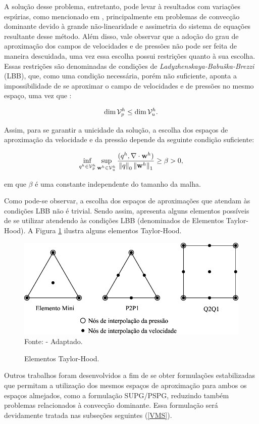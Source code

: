 \documentclass[_ArquivoPrincipal.tex]{subfiles}
\begin{document}
A solução desse problema, entretanto, pode levar à resultados com variações espúrias, como mencionado em \cite{fernandes2020tecnica,donea2003finite,brooks1982streamline}, principalmente em problemas de convecção dominante devido à grande não-linearidade e assimetria do sistema de equações resultante desse método. Além disso, vale observar que a adoção do grau de aproximação dos campos de velocidades e de pressões não pode ser feita de maneira descuidada, uma vez essa escolha possui restrições quanto à sua escolha. Essas restrições são denominadas de condições de \textit{Ladyzhenskaya-Babuška-Brezzi} (LBB), que, como uma condição necessária, porém não suficiente, aponta a impossibilidade de se aproximar o campo de velocidades e de pressões no mesmo espaço, uma vez que \cite{donea2003finite}:

\begin{equation}
    \dim{\mathcal{V}_p^h}\leq\dim{\mathcal{V}_u^h}\text{.}
\end{equation}

Assim, para se garantir a unicidade da solução, a escolha dos espaços de aproximação da velocidade e da pressão depende da seguinte condição suficiente:

\begin{equation}
    \inf_{q^h\in\mathcal{V}_p^h}{\sup_{\mathbf{w}^h\in\mathcal{V}_u^h}{\frac{(q^h,\mathbf{\nabla}\cdot\mathbf{w}^h)}{\left\lVert{q}\right\lVert_0\left\lVert{\mathbf{w}^h}\right\lVert_1}}}\geq\beta>0\text{,}
\end{equation}

\noindent em que $\beta$ é uma constante independente do tamanho da malha.

Como pode-se observar, a escolha dos espaços de aproximações que atendam às condições LBB não é trivial. Sendo assim,  apresenta alguns elementos possíveis de se utilizar atendendo às condições LBB (denominados de Elementos Taylor-Hood). A Figura \ref{fig:Taylor-Hood} ilustra alguns elementos Taylor-Hood.

\begin{figure}[h]
    \centering
    \caption{Elementos Taylor-Hood.}
    \includegraphics[width=.75\linewidth]{../../Figuras/Taylor-Hood.pdf}
    \\Fonte:  - Adaptado.
    \label{fig:Taylor-Hood}
\end{figure}

Outros trabalhos foram desenvolvidos a fim de se obter formulações estabilizadas que permitam a utilização dos mesmos espaços de aproximação para ambos os espaços almejados, como a formulação SUPG/PSPG, reduzindo também problemas relacionados à convecção dominante. Essa formulação será devidamente tratada nas subseções seguintes (\ref{VMS}).
\end{document}

